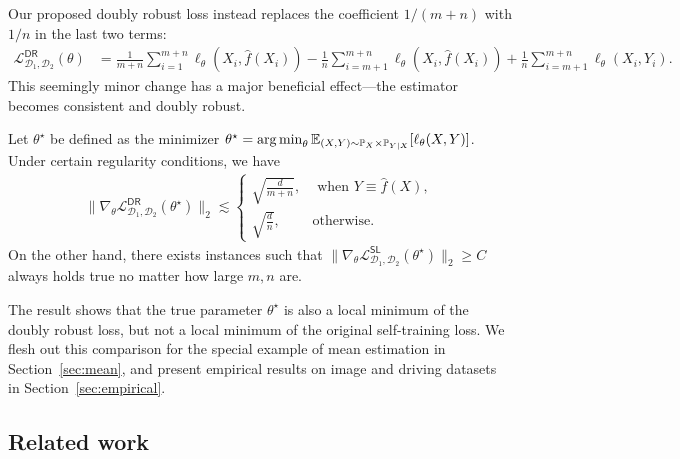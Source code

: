 Our proposed doubly robust loss instead replaces the coefficient $1/(m+n)$ with $1/n$ in the last two terms:
\begin{align*}
\mathcal{L}^{\mathsf{DR}}_{\mathcal{D}_1,\mathcal{D}_2}(\theta) 
& = \frac{1}{m+n}  \sum_{i=1}^{m+n} \ell_\theta(X_i, \hat f(X_i)) -  \frac{1}{n} \sum_{i=m+1}^{m+n} \ell_\theta(X_i, \hat f(X_i))  + \frac{1}{n} \sum_{i=m+1}^{m+n} \ell_\theta(X_i, Y_i). 
\end{align*}
This seemingly minor change has a major beneficial effect---the estimator becomes consistent and doubly robust. 
\begin{theorem}[Informal]
    Let $\theta^\star$ be defined as the minimizer  $\theta^\star = \operatorname*{arg\,min}_{\theta} \mathbb{E}_{(X, Y)\sim \mathbb{P}_{X}\times \mathbb{P}_{Y|X}}[\ell_\theta(X, Y)]$. Under certain regularity conditions, we have 
    \begin{align*}
  \| \nabla_\theta \mathcal{L}^{\mathsf{DR}}_{\mathcal{D}_1,\mathcal{D}_2}(\theta^\star) \|_2 \lesssim  
  \begin{cases}
  \sqrt{\frac{d}{m+n}}, & \text{ when } Y \equiv \hat f(X), \\
  \sqrt{\frac{d}{n}}, & \text{otherwise}. 
  \end{cases}
\end{align*}  
On the other hand, there exists instances such that $  \| \nabla_\theta \mathcal{L}^{\mathsf{SL}}_{\mathcal{D}_1,\mathcal{D}_2}(\theta^\star) \|_2\geq C$ always holds true no matter how large $m, n$ are. 
\end{theorem} 
The result shows that the true parameter $\theta^\star$ is also a local minimum of the doubly robust loss, but not a local minimum of the original self-training loss.  We flesh out this comparison for the special example of mean estimation in Section~\ref{sec:mean}, and present empirical results on image and driving datasets in  Section~\ref{sec:empirical}.


\subsection{Related work}

